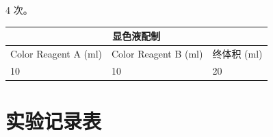 \documentclass[UTF8,10pt,a4paper,fontset=fandol]{ctexart}
\newcommand{\fieldvalue}[1]{#1}
\newcommand{\handwritten}[1]{#1}
\begin{document}
\fieldvalue{\handwritten{4}} 次。

\begin{center}
\small
\begin{tabular}{|p{4.3cm}|p{4.3cm}|p{2.6cm}|}
\hline
\multicolumn{3}{|c|}{显色液配制}\\ \hline
Color Reagent A (ml) &
Color Reagent B (ml) &
终体积 (ml)\\ \hline
\fieldvalue{\handwritten{10}}
&
\fieldvalue{\handwritten{10}}
&
\fieldvalue{\handwritten{20}}
\\ \hline
\end{tabular}
\end{center}


\newpage

\section*{实验记录表}
\end{document}
